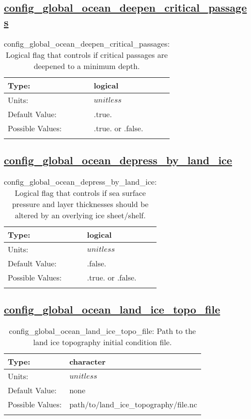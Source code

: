 \subsection[config\_global\_ocean\_deepen\_critical\_passages]{\hyperref[sec:nm_tab_global_ocean]{config\_global\_ocean\_deepen\_critical\_passages}}
\label{subsec:nm_sec_config_global_ocean_deepen_critical_passages}
\begin{center}
\begin{longtable}{| p{2.0in} || p{4.0in} |}
    \hline
    Type: & logical \\
    \hline
    Units: & $unitless$ \\
    \hline
    Default Value: & .true. \\
    \hline
    Possible Values: & .true. or .false. \\
    \hline
    \caption{config\_global\_ocean\_deepen\_critical\_passages: Logical flag that controls if critical passages are deepened to a minimum depth.}
\end{longtable}
\end{center}
\subsection[config\_global\_ocean\_depress\_by\_land\_ice]{\hyperref[sec:nm_tab_global_ocean]{config\_global\_ocean\_depress\_by\_land\_ice}}
\label{subsec:nm_sec_config_global_ocean_depress_by_land_ice}
\begin{center}
\begin{longtable}{| p{2.0in} || p{4.0in} |}
    \hline
    Type: & logical \\
    \hline
    Units: & $unitless$ \\
    \hline
    Default Value: & .false. \\
    \hline
    Possible Values: & .true. or .false. \\
    \hline
    \caption{config\_global\_ocean\_depress\_by\_land\_ice: Logical flag that controls if sea surface pressure and layer thicknesses should be altered by an overlying ice sheet/shelf.}
\end{longtable}
\end{center}
\subsection[config\_global\_ocean\_land\_ice\_topo\_file]{\hyperref[sec:nm_tab_global_ocean]{config\_global\_ocean\_land\_ice\_topo\_file}}
\label{subsec:nm_sec_config_global_ocean_land_ice_topo_file}
\begin{center}
\begin{longtable}{| p{2.0in} || p{4.0in} |}
    \hline
    Type: & character \\
    \hline
    Units: & $unitless$ \\
    \hline
    Default Value: & none \\
    \hline
    Possible Values: & path/to/land\_ice\_topography/file.nc \\
    \hline
    \caption{config\_global\_ocean\_land\_ice\_topo\_file: Path to the land ice topography initial condition file.}
\end{longtable}
\end{center}
